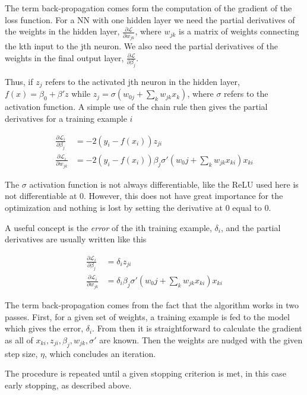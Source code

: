 \documentclass[11pt]{article}
\begin{document}
The term back-propagation comes form the computation of the gradient of the loss function. For a NN with one hidden layer we need the partial derivatives of the weights in the hidden layer, \(\frac{\partial \mathcal{L}}{\partial w_{jk}}\), where \(w_{jk}\) is a matrix of weights connecting the kth input to the jth neuron. We also need the partial derivatives of the weights in the final output layer, \(\frac{\partial \mathcal{L}}{\partial \beta_{j}}\). 

Thus, if \(z_j\) refers to the activated jth neuron in the hidden layer, \(f(x) = \beta_0 + \beta'z\) while \(z_j = \sigma(w_{0j} + \sum_k w_{jk}x_k)\), where \(\sigma\) refers to the activation function. A simple use of the chain rule then gives the partial derivatives for a training example \(i\)

\begin{align*}
  \frac{\partial \mathcal{L}_i}{\partial \beta_{j}} &= -2(y_i - f(x_i))z_{ji} \\
  \frac{\partial \mathcal{L}_i}{\partial w_{jk}} &= -2(y_i - f(x_i))\beta_{j}\sigma'(w_0j + \sum_k w_{jk}x_{ki})x_{ki}
\end{align*}

The \(\sigma\) activation function is not always differentiable, like the ReLU used here is not differentiable at \(0\). However, this does not have great importance for the optimization and nothing is lost by setting the derivative at \(0\) equal to \(0\).

A useful concept is the \emph{error} of the ith training example, \(\delta_i\), and the partial derivatives are usually written like this

\begin{align*}
  \frac{\partial \mathcal{L}_i}{\partial \beta_{j}} &= \delta_i z_{ji} \\
  \frac{\partial \mathcal{L}_i}{\partial w_{jk}} &= \delta_i \beta_{j}\sigma'(w_0j + \sum_k w_{jk}x_{ki})x_{ki}
\end{align*}

The term back-propagation comes from the fact that the algorithm works in two passes. First, for a given set of weights, a training example is fed to the model which gives the error, \(\delta_i\). From then it is straightforward to calculate the gradient as all of \(x_{ki}, z_{ji}, \beta_j, w_{jk}, \sigma'\) are known. Then the weights are nudged with the given step size, \(\eta\), which concludes an iteration. 

The procedure is repeated until a given stopping criterion is met, in this case early stopping, as described above.
\end{document}
